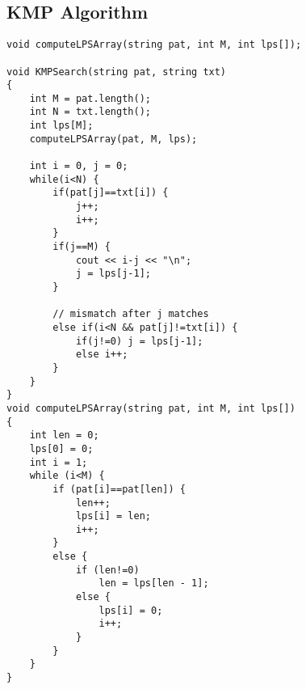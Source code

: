 \documentclass{article}
\begin{document}
        \subsection{KMP Algorithm}
        

        \begin{lstlisting}
void computeLPSArray(string pat, int M, int lps[]);

void KMPSearch(string pat, string txt)
{
    int M = pat.length();
    int N = txt.length();
    int lps[M];
    computeLPSArray(pat, M, lps);
    
    int i = 0, j = 0;
    while(i<N) {
        if(pat[j]==txt[i]) {
            j++;
            i++;
        }
        if(j==M) {
            cout << i-j << "\n";
            j = lps[j-1];
        }
    
        // mismatch after j matches
        else if(i<N && pat[j]!=txt[i]) {
            if(j!=0) j = lps[j-1];
            else i++;
        }
    }
}
void computeLPSArray(string pat, int M, int lps[])
{
    int len = 0;
    lps[0] = 0;
    int i = 1;
    while (i<M) {
        if (pat[i]==pat[len]) {
            len++;
            lps[i] = len;
            i++;
        }
        else {
            if (len!=0)
                len = lps[len - 1];
            else {
                lps[i] = 0;
                i++;
            }
        }
    }
}\end{lstlisting}



\end{document}
